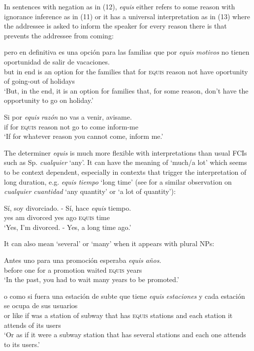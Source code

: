 \documentclass[output=paper]{langsci/langscibook}
\begin{document}
In sentences with negation as in (12), \textit{equis} either refers to some reason with ignorance inference as in (11) or it has a universal interpretation as in (13) where the addressee is asked to inform the speaker for every reason there is that prevents the addressee from coming:

\ea
\gll  pero en definitiva es una opción para las familias que por \textit{equis} \textit{motivos} no tienen oportunidad de salir de vacaciones.\\
but in end is an option for the families that for \textsc{equis} reason not have oportunity of going-out of holidays\\
\glt ‘But, in the end, it is an option for families that, for some reason, don’t have the opportunity to go on holiday.’
\z

\ea
\gll  Si por \textit{equis} \textit{razón} no vas a venir, avisame.\\
if for \textsc{equis} reason not go to come inform-me\\
\glt ‘If for whatever reason you cannot come, inform me.’
\z

The determiner \textit{equis} is much more flexible with interpretations than usual FCIs such as Sp. \textit{cualquier} ‘any’. It can have the meaning of ‘much/a lot’ which seems to be context dependent, especially in contexts that trigger the interpretation of long duration, e.g. \textit{equis tiempo} ‘long time’ (see \citealt{Rivero2011} for a similar observation on \textit{cualquier cuantidad} ‘any quantity’ or ‘a lot of quantity’):

\ea
\gll Sí, soy divorciado. - Sí, hace \textit{equis} tiempo.\\
yes am divorced {} yes ago \textsc{equis} time\\
\glt ‘Yes, I’m divorced. - Yes, a long time ago.’
\z

It can also mean ‘several’ or ‘many’ when it appears with plural NPs:

\ea
\gll  Antes uno para una promoción esperaba \textit{equis} \textit{años}.\\
before one for a promotion waited \textsc{equis} years\\
\glt ‘In the past, you had to wait many years to be promoted.’
\z

\ea
\gll  o como si fuera una estación de subte que tiene \textit{equis} \textit{estaciones} y cada estación se ocupa de sus usuarios\\
or like if was a station of subway that has \textsc{equis} stations and each station it attends of its users\\
\glt ‘Or as if it were a subway station that has several stations and each one attends to its users.’
\z
\end{document}
